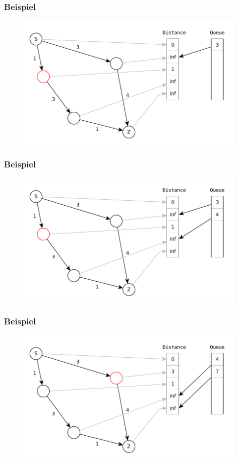 \begin{frame}
\frametitle{Beispiel}
\begin{figure}
\includegraphics[scale=.8]{dijkstra_graphs/dijkstra_3.pdf}
\end{figure}
\end{frame}

\begin{frame}
\frametitle{Beispiel}
\begin{figure}
\includegraphics[scale=.8]{dijkstra_graphs/dijkstra_4.pdf}
\end{figure}
\end{frame}

\begin{frame}
\frametitle{Beispiel}
\begin{figure}
\includegraphics[scale=.8]{dijkstra_graphs/dijkstra_5.pdf}
\end{figure}
\end{frame}

